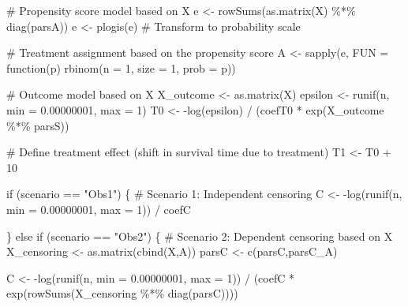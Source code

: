 \documentclass[
  11pt,
  a4paper,
]{article}
\newenvironment{Shaded}{}{}
\newcommand{\AttributeTok}[1]{\textcolor[rgb]{0.84,0.23,0.29}{#1}}
\newcommand{\CommentTok}[1]{\textcolor[rgb]{0.42,0.45,0.49}{#1}}
\newcommand{\ControlFlowTok}[1]{\textcolor[rgb]{0.84,0.23,0.29}{#1}}
\newcommand{\DecValTok}[1]{\textcolor[rgb]{0.00,0.36,0.77}{#1}}
\newcommand{\FloatTok}[1]{\textcolor[rgb]{0.00,0.36,0.77}{#1}}
\newcommand{\FunctionTok}[1]{\textcolor[rgb]{0.44,0.26,0.76}{#1}}
\newcommand{\NormalTok}[1]{\textcolor[rgb]{0.14,0.16,0.18}{#1}}
\newcommand{\OtherTok}[1]{\textcolor[rgb]{0.44,0.26,0.76}{#1}}
\newcommand{\SpecialCharTok}[1]{\textcolor[rgb]{0.00,0.36,0.77}{#1}}
\newcommand{\StringTok}[1]{\textcolor[rgb]{0.01,0.18,0.38}{#1}}
\theoremstyle{plain}
\theoremstyle{plain}
\theoremstyle{plain}
\theoremstyle{definition}
\theoremstyle{remark}
\begin{document}
\begin{Shaded}
\begin{Highlighting}[]
  \CommentTok{\# Propensity score model based on X}
\NormalTok{  e }\OtherTok{\textless{}{-}} \FunctionTok{rowSums}\NormalTok{(}\FunctionTok{as.matrix}\NormalTok{(X) }\SpecialCharTok{\%*\%} \FunctionTok{diag}\NormalTok{(parsA))}
\NormalTok{  e }\OtherTok{\textless{}{-}} \FunctionTok{plogis}\NormalTok{(e)  }\CommentTok{\# Transform to probability scale}
  
  \CommentTok{\# Treatment assignment based on the propensity score}
\NormalTok{  A }\OtherTok{\textless{}{-}} \FunctionTok{sapply}\NormalTok{(e, }\AttributeTok{FUN =} \ControlFlowTok{function}\NormalTok{(p) }\FunctionTok{rbinom}\NormalTok{(}\AttributeTok{n =} \DecValTok{1}\NormalTok{, }\AttributeTok{size =} \DecValTok{1}\NormalTok{, }\AttributeTok{prob =}\NormalTok{ p))}
  
  \CommentTok{\# Outcome model based on X}
\NormalTok{  X\_outcome }\OtherTok{\textless{}{-}} \FunctionTok{as.matrix}\NormalTok{(X)}
\NormalTok{  epsilon }\OtherTok{\textless{}{-}} \FunctionTok{runif}\NormalTok{(n, }\AttributeTok{min =} \FloatTok{0.00000001}\NormalTok{, }\AttributeTok{max =} \DecValTok{1}\NormalTok{)}
\NormalTok{  T0 }\OtherTok{\textless{}{-}} \SpecialCharTok{{-}}\FunctionTok{log}\NormalTok{(epsilon) }\SpecialCharTok{/}\NormalTok{ (coefT0 }\SpecialCharTok{*} \FunctionTok{exp}\NormalTok{(X\_outcome }\SpecialCharTok{\%*\%}\NormalTok{ parsS))}
  
  \CommentTok{\# Define treatment effect (shift in survival time due to treatment)}
\NormalTok{  T1 }\OtherTok{\textless{}{-}}\NormalTok{ T0 }\SpecialCharTok{+} \DecValTok{10}
  
  \ControlFlowTok{if}\NormalTok{ (scenario }\SpecialCharTok{==} \StringTok{"Obs1"}\NormalTok{) \{}
    \CommentTok{\# Scenario 1: Independent censoring}
\NormalTok{    C }\OtherTok{\textless{}{-}} \SpecialCharTok{{-}}\FunctionTok{log}\NormalTok{(}\FunctionTok{runif}\NormalTok{(n, }\AttributeTok{min =} \FloatTok{0.00000001}\NormalTok{, }\AttributeTok{max =} \DecValTok{1}\NormalTok{)) }\SpecialCharTok{/}\NormalTok{ coefC}
    
\NormalTok{  \} }\ControlFlowTok{else} \ControlFlowTok{if}\NormalTok{ (scenario }\SpecialCharTok{==} \StringTok{"Obs2"}\NormalTok{) \{}
    \CommentTok{\# Scenario 2: Dependent censoring based on X}
\NormalTok{    X\_censoring }\OtherTok{\textless{}{-}} \FunctionTok{as.matrix}\NormalTok{(}\FunctionTok{cbind}\NormalTok{(X,A))}
\NormalTok{    parsC }\OtherTok{\textless{}{-}} \FunctionTok{c}\NormalTok{(parsC,parsC\_A)}
    
\NormalTok{    C }\OtherTok{\textless{}{-}} \SpecialCharTok{{-}}\FunctionTok{log}\NormalTok{(}\FunctionTok{runif}\NormalTok{(n, }\AttributeTok{min =} \FloatTok{0.00000001}\NormalTok{, }\AttributeTok{max =} \DecValTok{1}\NormalTok{)) }\SpecialCharTok{/} 
\NormalTok{      (coefC }\SpecialCharTok{*} \FunctionTok{exp}\NormalTok{(}\FunctionTok{rowSums}\NormalTok{(X\_censoring }\SpecialCharTok{\%*\%} \FunctionTok{diag}\NormalTok{(parsC))))}
    

\end{Highlighting}
\end{Shaded}
\end{document}
